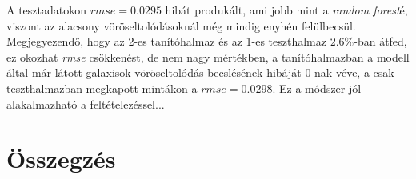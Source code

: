 \documentclass[12pt,letterpaper,twoside,openright]{book}
\begin{document}
A tesztadatokon $\textit{rmse} =0.0295$ hibát produkált, ami jobb mint a \textit{random forest}é, viszont az alacsony vöröseltolódásoknál még mindig enyhén felülbecsül. Megjegyezendő, hogy az 2-es tanítóhalmaz és az 1-es teszthalmaz $2.6\%$-ban átfed, ez okozhat \textit{rmse} csökkenést, de nem nagy mértékben, a tanítóhalmazban a modell által már látott galaxisok vöröseltolódás-becslésének hibáját $0$-nak véve, a csak teszthalmazban megkapott mintákon a $rmse = 0.0298$.
\newline\indent
Ez a módszer jól alakalmazható a feltételezéssel...


  \chapter{Összegzés}
\newpage
\end{document}
